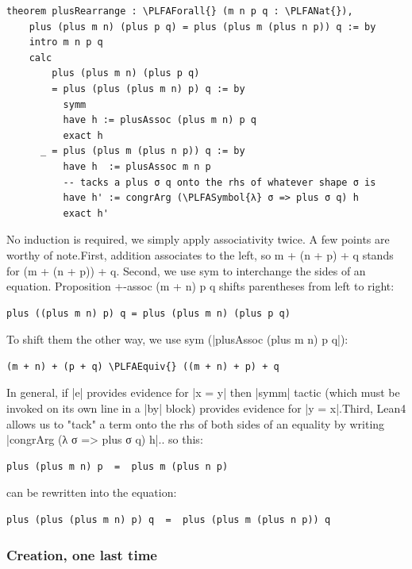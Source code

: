 \documentclass{memoir}
\newcommand{\PLFANat}{\ensuremath{\mathbb{N}}}
\newcommand{\PLFAForall}{\ensuremath{\forall}}
\newcommand{\PLFAEquiv}{\ensuremath{\equiv}}
\newcommand{\PLFASymbol}[1]{{\PLFASymbolFont #1}}
\begin{document}
\par
\begin{verbatim}
theorem plusRearrange : \PLFAForall{} (m n p q : \PLFANat{}),
    plus (plus m n) (plus p q) = plus (plus m (plus n p)) q := by
    intro m n p q
    calc
        plus (plus m n) (plus p q)
        = plus (plus (plus m n) p) q := by
          symm
          have h := plusAssoc (plus m n) p q
          exact h
      _ = plus (plus m (plus n p)) q := by
          have h  := plusAssoc m n p
          -- tacks a plus σ q onto the rhs of whatever shape σ is
          have h' := congrArg (\PLFASymbol{λ} σ => plus σ q) h
          exact h'
\end{verbatim}

\par
\par\noindent No induction is required, we simply apply associativity twice.
A few points are worthy of note.First, addition associates to the left, so m + (n + p) + q stands for (m + (n + p)) + q.
Second, we use sym to interchange the sides of an equation. Proposition +-assoc (m + n) p q shifts parentheses from left to right:\begin{verbatim}
plus ((plus m n) p) q = plus (plus m n) (plus p q)
\end{verbatim}
To shift them the other way, we use sym (\LeanVerb|plusAssoc (plus m n) p q|):\begin{verbatim}
(m + n) + (p + q) \PLFAEquiv{} ((m + n) + p) + q
\end{verbatim}
In general, if \LeanVerb|e| provides evidence for \LeanVerb|x = y| then \LeanVerb|symm| tactic
(which must be invoked on its own line in a \LeanVerb|by| block) provides evidence for
\LeanVerb|y = x|.Third, Lean4 allows us to "tack" a term onto the rhs of both sides of an
equality by writing \LeanVerb|congrArg (\PLFASymbol{λ} σ => plus σ q) h|.. so this:\begin{verbatim}
plus (plus m n) p  =  plus m (plus n p)
\end{verbatim}
can be rewritten into the equation:\begin{verbatim}
plus (plus (plus m n) p) q  =  plus (plus m (plus n p)) q
\end{verbatim}

\par

\subsubsection{Creation, one last time}\label{PLFA--in--Lean----Part--1----Induction-005F-005F-005F--Proof--by--Induction----Second--proof-005F-005F-005F--commutativity----Creation-005F-005F-005F--one--last--time}
\end{document}
